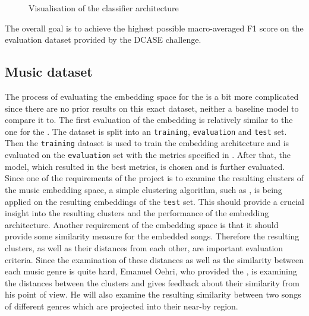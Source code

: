 \begin{figure}[htbp]
    \captionsetup{format=plain}
    \centering
    \caption{Visualisation of the classifier architecture}
    \label{fig:Classifier-DCASE-Visualisation}
\end{figure}
\noindent
The overall goal is to achieve the highest possible macro-averaged F1 score on the evaluation dataset provided by the DCASE challenge.

\subsection{Music dataset}
\label{sub:Eval-Music}
The process of evaluating the embedding space for the  is a bit more complicated since there are no prior results on this exact dataset, neither a baseline model to compare it to. The first evaluation of the embedding is relatively similar to the one for the . The dataset is split into an \texttt{training}, \texttt{evaluation} and \texttt{test} set. Then the \texttt{training} dataset is used to train the embedding architecture and is evaluated on the \texttt{evaluation} set with the metrics specified in . After that, the model, which resulted in the best metrics, is chosen and is further evaluated.
\newline
\newline
Since one of the requirements of the project is to examine the resulting clusters of the music embedding space, a simple clustering algorithm, such as , is being applied on the resulting embeddings of the \texttt{test} set. This should provide a crucial insight into the resulting clusters and the performance of the embedding architecture.
\newline
\newline
Another requirement of the embedding space is that it should provide some similarity measure for the embedded songs. Therefore the resulting clusters, as well as their distances from each other, are important evaluation criteria. Since the examination of these distances as well as the similarity between each music genre is quite hard, Emanuel Oehri, who provided the , is examining the distances between the clusters and gives feedback about their similarity from his point of view. He will also examine the resulting similarity between two songs of different genres which are projected into their near-by region.

